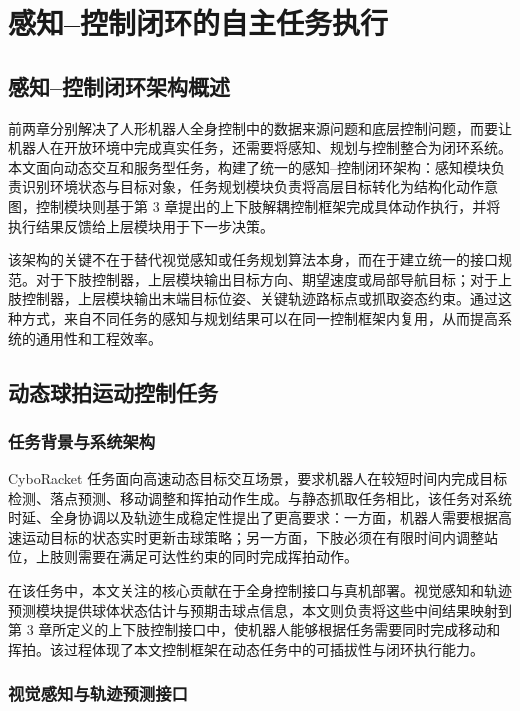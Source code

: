 
\chapter{感知--控制闭环的自主任务执行}

\section{感知--控制闭环架构概述}

前两章分别解决了人形机器人全身控制中的数据来源问题和底层控制问题，而要让机器人在开放环境中完成真实任务，还需要将感知、规划与控制整合为闭环系统。本文面向动态交互和服务型任务，构建了统一的感知--控制闭环架构：感知模块负责识别环境状态与目标对象，任务规划模块负责将高层目标转化为结构化动作意图，控制模块则基于第 3 章提出的上下肢解耦控制框架完成具体动作执行，并将执行结果反馈给上层模块用于下一步决策。

该架构的关键不在于替代视觉感知或任务规划算法本身，而在于建立统一的接口规范。对于下肢控制器，上层模块输出目标方向、期望速度或局部导航目标；对于上肢控制器，上层模块输出末端目标位姿、关键轨迹路标点或抓取姿态约束。通过这种方式，来自不同任务的感知与规划结果可以在同一控制框架内复用，从而提高系统的通用性和工程效率。

\section{动态球拍运动控制任务}

\subsection{任务背景与系统架构}

CyboRacket 任务面向高速动态目标交互场景，要求机器人在较短时间内完成目标检测、落点预测、移动调整和挥拍动作生成。与静态抓取任务相比，该任务对系统时延、全身协调以及轨迹生成稳定性提出了更高要求：一方面，机器人需要根据高速运动目标的状态实时更新击球策略；另一方面，下肢必须在有限时间内调整站位，上肢则需要在满足可达性约束的同时完成挥拍动作。

在该任务中，本文关注的核心贡献在于全身控制接口与真机部署。视觉感知和轨迹预测模块提供球体状态估计与预期击球点信息，本文则负责将这些中间结果映射到第 3 章所定义的上下肢控制接口中，使机器人能够根据任务需要同时完成移动和挥拍。该过程体现了本文控制框架在动态任务中的可插拔性与闭环执行能力。

\subsection{视觉感知与轨迹预测接口}


